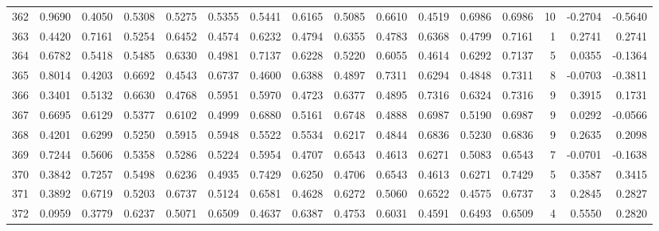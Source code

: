 \begin{tabular}{lrrrrrrrrrrrrrrr}
362 &      0.9690 &  0.4050 &  0.5308 &  0.5275 &  0.5355 &  0.5441 &  0.6165 &  0.5085 &  0.6610 &  0.4519 &   0.6986 &     0.6986 &     10 &                   -0.2704 &                    -0.5640 \\
363 &      0.4420 &  0.7161 &  0.5254 &  0.6452 &  0.4574 &  0.6232 &  0.4794 &  0.6355 &  0.4783 &  0.6368 &   0.4799 &     0.7161 &      1 &                    0.2741 &                     0.2741 \\
364 &      0.6782 &  0.5418 &  0.5485 &  0.6330 &  0.4981 &  0.7137 &  0.6228 &  0.5220 &  0.6055 &  0.4614 &   0.6292 &     0.7137 &      5 &                    0.0355 &                    -0.1364 \\
365 &      0.8014 &  0.4203 &  0.6692 &  0.4543 &  0.6737 &  0.4600 &  0.6388 &  0.4897 &  0.7311 &  0.6294 &   0.4848 &     0.7311 &      8 &                   -0.0703 &                    -0.3811 \\
366 &      0.3401 &  0.5132 &  0.6630 &  0.4768 &  0.5951 &  0.5970 &  0.4723 &  0.6377 &  0.4895 &  0.7316 &   0.6324 &     0.7316 &      9 &                    0.3915 &                     0.1731 \\
367 &      0.6695 &  0.6129 &  0.5377 &  0.6102 &  0.4999 &  0.6880 &  0.5161 &  0.6748 &  0.4888 &  0.6987 &   0.5190 &     0.6987 &      9 &                    0.0292 &                    -0.0566 \\
368 &      0.4201 &  0.6299 &  0.5250 &  0.5915 &  0.5948 &  0.5522 &  0.5534 &  0.6217 &  0.4844 &  0.6836 &   0.5230 &     0.6836 &      9 &                    0.2635 &                     0.2098 \\
369 &      0.7244 &  0.5606 &  0.5358 &  0.5286 &  0.5224 &  0.5954 &  0.4707 &  0.6543 &  0.4613 &  0.6271 &   0.5083 &     0.6543 &      7 &                   -0.0701 &                    -0.1638 \\
370 &      0.3842 &  0.7257 &  0.5498 &  0.6236 &  0.4935 &  0.7429 &  0.6250 &  0.4706 &  0.6543 &  0.4613 &   0.6271 &     0.7429 &      5 &                    0.3587 &                     0.3415 \\
371 &      0.3892 &  0.6719 &  0.5203 &  0.6737 &  0.5124 &  0.6581 &  0.4628 &  0.6272 &  0.5060 &  0.6522 &   0.4575 &     0.6737 &      3 &                    0.2845 &                     0.2827 \\
372 &      0.0959 &  0.3779 &  0.6237 &  0.5071 &  0.6509 &  0.4637 &  0.6387 &  0.4753 &  0.6031 &  0.4591 &   0.6493 &     0.6509 &      4 &                    0.5550 &                     0.2820 \\

\end{tabular}
